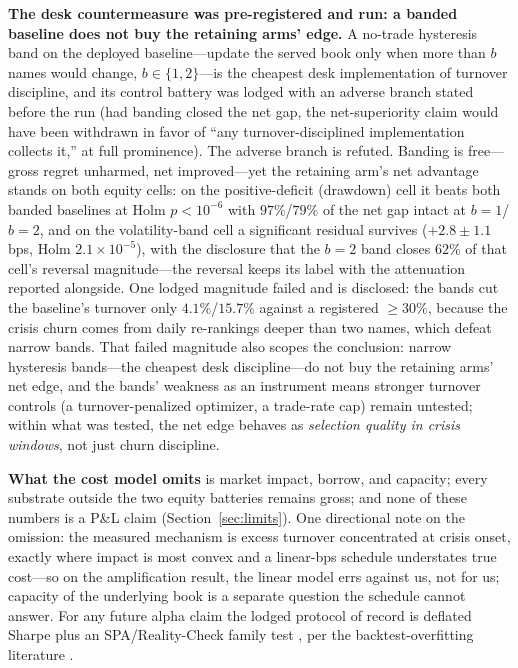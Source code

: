 \documentclass[sigconf,anonymous]{acmart}
\begin{document}
\textbf{The desk countermeasure was pre-registered and run: a banded
baseline does not buy the retaining arms' edge.} A no-trade hysteresis
band on the deployed baseline---update the served book only when more
than $b$ names would change, $b \in \{1, 2\}$---is the cheapest desk
implementation of turnover discipline, and its control battery was
lodged with an adverse branch stated before the run (had banding
closed the net gap, the net-superiority claim would have been
withdrawn in favor of ``any turnover-disciplined implementation
collects it,'' at full prominence). The adverse branch is refuted.
Banding is free---gross regret unharmed, net improved---yet the
retaining arm's net advantage stands on both equity cells: on the
positive-deficit (drawdown) cell it beats both banded baselines at
Holm $p<10^{-6}$ with $97\%$/$79\%$ of the net gap
intact at $b{=}1$/$b{=}2$, and on the volatility-band cell a
significant residual survives ($+2.8 \pm 1.1$\,bps, Holm
$2.1{\times}10^{-5}$), with the disclosure that the $b{=}2$ band
closes $62\%$ of that cell's reversal magnitude---the reversal keeps
its label with the attenuation reported alongside. One lodged
magnitude failed and is disclosed: the bands
cut the baseline's turnover only $4.1\%$/$15.7\%$ against a
registered ${\ge}30\%$, because the crisis churn comes from daily
re-rankings deeper than two names, which defeat narrow bands. That
failed magnitude also scopes the conclusion: narrow hysteresis
bands---the cheapest desk discipline---do not buy the retaining arms'
net edge, and the bands' weakness as an instrument means stronger
turnover controls (a turnover-penalized optimizer, a trade-rate cap)
remain untested; within what was tested, the net edge behaves as
\emph{selection quality in crisis windows}, not just churn
discipline.

\textbf{What the cost model omits} is market impact, borrow, and
capacity; every substrate outside the two equity batteries remains
gross; and none of these numbers is a P\&L claim
(Section~\ref{sec:limits}). One directional note on the omission: the
measured mechanism is excess turnover concentrated at crisis onset,
exactly where impact is most convex and a linear-bps schedule
understates true cost---so on the amplification result, the linear
model errs against us, not for us; capacity of the underlying book is
a separate question the schedule cannot answer. For any future alpha claim the lodged
protocol of record is deflated Sharpe \cite{bailey2014deflated} plus an
SPA/Reality-Check family test \cite{hansen2005spa,white2000reality},
per the backtest-overfitting literature
\cite{harvey2016backtesting,lopez2018advances}.
\end{document}
